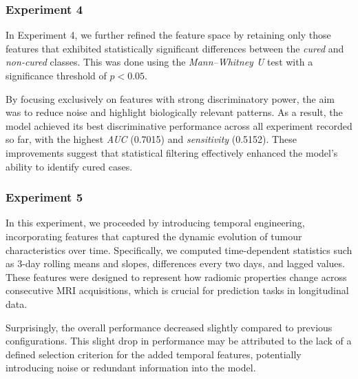 \documentclass[12pt, a4paper]{report}
\begin{document}
\subsubsection{Experiment 4}  
In Experiment 4, we further refined the feature space by retaining only those features that exhibited statistically significant differences between the \textit{cured} and \textit{non-cured} classes. This was done using the \textit{Mann–Whitney U} test with a significance threshold of $p < 0.05$. 

By focusing exclusively on features with strong discriminatory power, the aim was to reduce noise and highlight biologically relevant patterns. As a result, the model achieved its best discriminative performance across all experiment recorded so far, with the highest \textit{AUC} (0.7015) and \textit{sensitivity} (0.5152). These improvements suggest that statistical filtering effectively enhanced the model's ability to identify cured cases.

\begin{table}[H]
\centering
\renewcommand{\arraystretch}{1.5} %
\normalsize %
\caption{Configuration 4 - Keep only significant features}
\end{table}

\subsubsection{Experiment 5}
In this experiment, we proceeded by introducing temporal engineering, incorporating features that captured the dynamic evolution of tumour characteristics over time. Specifically, we computed time-dependent statistics such as 3-day rolling means and slopes, differences every two days, and lagged values. These features were designed to represent how radiomic properties change across consecutive MRI acquisitions, which is crucial for prediction tasks in longitudinal data.

Surprisingly, the overall performance decreased slightly compared to previous configurations.  This slight drop in performance may be attributed to the lack of a defined selection criterion for the added temporal features, potentially introducing noise or redundant information into the model.
\end{document}
